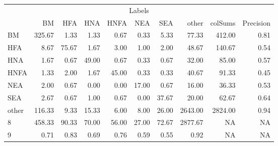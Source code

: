 \begin{table}
\centering\begingroup\fontsize{11}{13}\selectfont

\begin{tabular}{lrrrrrr>{}r|rr}
\toprule
\multicolumn{10}{c}{Labels} \\
\cmidrule(l{3pt}r{3pt}){1-10}
  & BM & HFA & HNA & HNFA & NEA & SEA & other & colSums & Precision\\
\midrule
BM & 325.67 & 1.33 & 1.33 & 0.67 & 0.33 & 5.33 & 77.33 & 412.00 & 0.81\\
HFA & 8.67 & 75.67 & 1.67 & 3.00 & 1.00 & 2.00 & 48.67 & 140.67 & 0.54\\
HNA & 1.67 & 0.67 & 49.00 & 0.67 & 0.33 & 0.67 & 32.00 & 85.00 & 0.57\\
HNFA & 1.33 & 2.00 & 1.67 & 45.00 & 0.33 & 0.33 & 40.67 & 91.33 & 0.45\\
NEA & 2.00 & 0.67 & 0.00 & 0.00 & 17.00 & 0.67 & 16.00 & 36.33 & 0.53\\
\addlinespace
SEA & 2.67 & 0.67 & 1.00 & 0.67 & 0.00 & 37.67 & 20.00 & 62.67 & 0.64\\
other & 116.33 & 9.33 & 15.33 & 6.00 & 8.00 & 26.00 & 2643.00 & 2824.00 & 0.94\\
8 & 458.33 & 90.33 & 70.00 & 56.00 & 27.00 & 72.67 & 2877.67 & NA & NA\\
9 & 0.71 & 0.83 & 0.69 & 0.76 & 0.59 & 0.55 & 0.92 & NA & NA\\
\bottomrule
\end{tabular}
\endgroup{}
\end{table}
